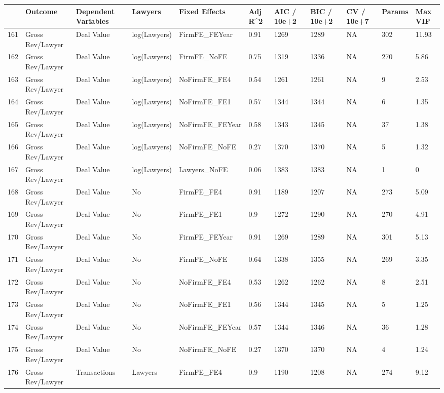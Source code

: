 \documentclass{article}
\begin{document}
\begin{table}[H]
\centering
\begin{tabular}{rllllllllll}
  \hline
 & Outcome & Dependent Variables & Lawyers & Fixed Effects & Adj R^2 & AIC / 10e+2 & BIC / 10e+2 & CV / 10e+7 & Params & Max VIF \\ 
  \hline
161 & Gross Rev/Lawyer & Deal Value & log(Lawyers) & FirmFE\_FEYear & 0.91 & 1269 & 1289 & NA & 302 & 11.93 \\ 
  162 & Gross Rev/Lawyer & Deal Value & log(Lawyers) & FirmFE\_NoFE & 0.75 & 1319 & 1336 & NA & 270 & 5.86 \\ 
  163 & Gross Rev/Lawyer & Deal Value & log(Lawyers) & NoFirmFE\_FE4 & 0.54 & 1261 & 1261 & NA & 9 & 2.53 \\ 
  164 & Gross Rev/Lawyer & Deal Value & log(Lawyers) & NoFirmFE\_FE1 & 0.57 & 1344 & 1344 & NA & 6 & 1.35 \\ 
  165 & Gross Rev/Lawyer & Deal Value & log(Lawyers) & NoFirmFE\_FEYear & 0.58 & 1343 & 1345 & NA & 37 & 1.38 \\ 
  166 & Gross Rev/Lawyer & Deal Value & log(Lawyers) & NoFirmFE\_NoFE & 0.27 & 1370 & 1370 & NA & 5 & 1.32 \\ 
  167 & Gross Rev/Lawyer & Deal Value & log(Lawyers) & Lawyers\_NoFE & 0.06 & 1383 & 1383 & NA & 1 & 0 \\ 
  168 & Gross Rev/Lawyer & Deal Value & No & FirmFE\_FE4 & 0.91 & 1189 & 1207 & NA & 273 & 5.09 \\ 
  169 & Gross Rev/Lawyer & Deal Value & No & FirmFE\_FE1 & 0.9 & 1272 & 1290 & NA & 270 & 4.91 \\ 
  170 & Gross Rev/Lawyer & Deal Value & No & FirmFE\_FEYear & 0.91 & 1269 & 1289 & NA & 301 & 5.13 \\ 
  171 & Gross Rev/Lawyer & Deal Value & No & FirmFE\_NoFE & 0.64 & 1338 & 1355 & NA & 269 & 3.35 \\ 
  172 & Gross Rev/Lawyer & Deal Value & No & NoFirmFE\_FE4 & 0.53 & 1262 & 1262 & NA & 8 & 2.51 \\ 
  173 & Gross Rev/Lawyer & Deal Value & No & NoFirmFE\_FE1 & 0.56 & 1344 & 1345 & NA & 5 & 1.25 \\ 
  174 & Gross Rev/Lawyer & Deal Value & No & NoFirmFE\_FEYear & 0.57 & 1344 & 1346 & NA & 36 & 1.28 \\ 
  175 & Gross Rev/Lawyer & Deal Value & No & NoFirmFE\_NoFE & 0.27 & 1370 & 1370 & NA & 4 & 1.24 \\ 
  176 & Gross Rev/Lawyer & Transactions & Lawyers & FirmFE\_FE4 & 0.9 & 1190 & 1208 & NA & 274 & 9.12 \\ 

\end{tabular}
\end{table}
\end{document}
